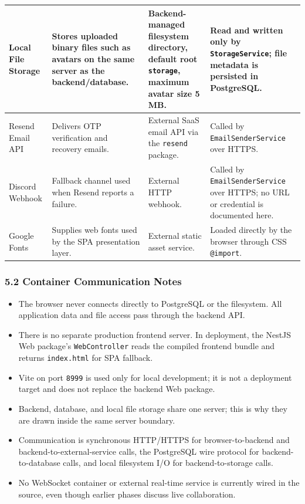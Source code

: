 \documentclass[12pt]{article}
\begin{document}
\begin{longtable}{|>{\raggedright\arraybackslash}p{}|>{\raggedright\arraybackslash}p{}|>{\raggedright\arraybackslash}p{}|>{\raggedright\arraybackslash}p{}|}
Local File Storage & Stores uploaded binary files such as avatars on the same server as the backend/database. & Backend-managed filesystem directory, default root \texttt{storage}, maximum avatar size 5 MB. & Read and written only by \texttt{StorageService}; file metadata is persisted in PostgreSQL. \\ \hline
Resend Email API & Delivers OTP verification and recovery emails. & External SaaS email API via the \texttt{resend} package. & Called by \texttt{EmailSenderService} over HTTPS. \\ \hline
Discord Webhook & Fallback channel used when Resend reports a failure. & External HTTP webhook. & Called by \texttt{EmailSenderService} over HTTPS; no URL or credential is documented here. \\ \hline
Google Fonts & Supplies web fonts used by the SPA presentation layer. & External static asset service. & Loaded directly by the browser through CSS \texttt{@import}. \\ \hline
\end{longtable}
\endgroup
\par\medskip

\hypertarget{sec:5-2-container-communication-notes}{}
\subsubsection*{5.2 Container Communication Notes}
\par\medskip

\begin{itemize}
\item The browser never connects directly to PostgreSQL or the filesystem. All application data and file access pass through the backend API.
\item There is no separate production frontend server. In deployment, the NestJS Web package's \texttt{WebController} reads the compiled frontend bundle and returns \texttt{index.html} for SPA fallback.
\item Vite on port \texttt{8999} is used only for local development; it is not a deployment target and does not replace the backend Web package.
\item Backend, database, and local file storage share one server; this is why they are drawn inside the same server boundary.
\item Communication is synchronous HTTP/HTTPS for browser-to-backend and backend-to-external-service calls, the PostgreSQL wire protocol for backend-to-database calls, and local filesystem I/O for backend-to-storage calls.
\item No WebSocket container or external real-time service is currently wired in the source, even though earlier phases discuss live collaboration.
\end{itemize}
\par\medskip
\end{document}
